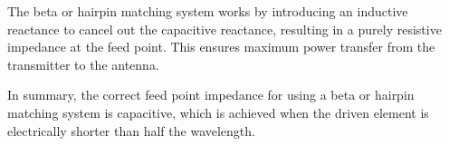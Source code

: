 The beta or hairpin matching system works by introducing an inductive reactance to cancel out the capacitive reactance, resulting in a purely resistive impedance at the feed point. This ensures maximum power transfer from the transmitter to the antenna.

In summary, the correct feed point impedance for using a beta or hairpin matching system is capacitive, which is achieved when the driven element is electrically shorter than half the wavelength.

